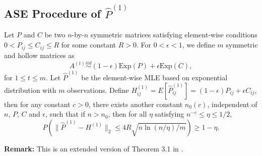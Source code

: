 \subsection{ASE Procedure of $\hat{P}^{(1)}$}
\label{section:pf_MLEvsMLEASE1}

\begin{theorem}%
\label{thm:P1Diff}
Let $P$ and $C$ be two $n$-by-$n$ symmetric matrices satisfying element-wise conditions $0 < P_{ij} \le C_{ij} \le R$ for some constant $R > 0$. For $0 < \epsilon < 1$, we define $m$ symmetric and hollow matrices as
\[
	A^{(t)} \stackrel{iid}{\sim} (1-\epsilon) \mathrm{Exp}(P) + \epsilon \mathrm{Exp}(C),
\]
for $1 \le t \le m$.
Let $\hat{P}^{(1)}$ be the element-wise MLE based on exponential distribution with $m$ observations.
Define $H_{ij}^{(1)} = E[\hat{P}_{ij}^{(1)}] = (1-\epsilon) P_{ij} + \epsilon C_{ij}$,
then for any constant $c > 0$, there exists another constant $n_0(c)$, independent of $n$, $P$, $C$ and $\epsilon$, such that if $n > n_0$, then for all $\eta$ satisfying $n^{-c} \le \eta \le 1/2$,
\[
	P \left( \| \hat{P}^{(1)} - H^{(1)} \|_2 \le 4 R \sqrt{n \ln(n/\eta)/m}\right) \ge 1 - \eta.
\]
\end{theorem}
\textbf{Remark:} This is an extended version of Theorem 3.1 in \citep{oliveira2009concentration}. \\
